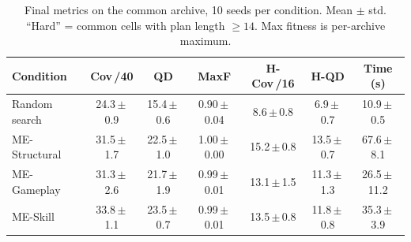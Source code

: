 \begin{table}[t]
\centering
\caption{Final metrics on the common archive, 10 seeds per condition. Mean $\pm$ std. ``Hard'' = common cells with plan length $\geq 14$. Max fitness is per-archive maximum.}
\label{tab:main}
\setlength{\tabcolsep}{4pt}
\begin{tabular}{l c c c c c c}
\toprule
Condition & Cov\,/40 & QD & MaxF & H-Cov\,/16 & H-QD & Time (s) \\
\midrule
Random search & 24.3\,$\pm$\,0.9 & 15.4\,$\pm$\,0.6 & 0.90\,$\pm$\,0.04 & 8.6\,$\pm$\,0.8 & 6.9\,$\pm$\,0.7 & 10.9\,$\pm$\,0.5 \\
ME-Structural & 31.5\,$\pm$\,1.7 & 22.5\,$\pm$\,1.0 & 1.00\,$\pm$\,0.00 & 15.2\,$\pm$\,0.8 & 13.5\,$\pm$\,0.7 & 67.6\,$\pm$\,8.1 \\
ME-Gameplay & 31.3\,$\pm$\,2.6 & 21.7\,$\pm$\,1.9 & 0.99\,$\pm$\,0.01 & 13.1\,$\pm$\,1.5 & 11.3\,$\pm$\,1.3 & 26.5\,$\pm$\,11.2 \\
ME-Skill & 33.8\,$\pm$\,1.1 & 23.5\,$\pm$\,0.7 & 0.99\,$\pm$\,0.01 & 13.5\,$\pm$\,0.8 & 11.8\,$\pm$\,0.8 & 35.3\,$\pm$\,3.9 \\
\bottomrule
\end{tabular}
\end{table}